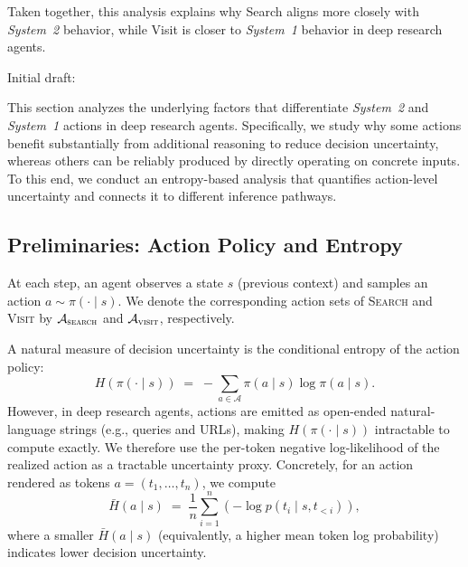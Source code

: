 Taken together, this analysis explains why Search aligns more closely with \emph{System~2} behavior, while Visit is closer to \emph{System~1} behavior in deep research agents.








\iffalse

Initial draft:

This section analyzes the underlying factors that differentiate \textit{System~2} and \textit{System~1} actions in deep research agents.
Specifically, we study why some actions benefit substantially from additional reasoning to reduce decision uncertainty, whereas others can be reliably produced by directly operating on concrete inputs.
To this end, we conduct an entropy-based analysis that quantifies action-level uncertainty and connects it to different inference pathways.

\subsection{Preliminaries: Action Policy and Entropy}
At each step, an agent observes a state $s$ (previous context) and samples an action $a \sim \pi(\cdot \mid s)$.
We denote the corresponding action sets of \textsc{Search} and \textsc{Visit} by $\mathcal{A}_{\textsc{search}}$ and $\mathcal{A}_{\textsc{visit}}$, respectively.

A natural measure of decision uncertainty is the conditional entropy of the action policy:
\begin{equation}
H(\pi(\cdot \mid s)) \;=\; -\sum_{a \in \mathcal{A}} \pi(a \mid s)\log \pi(a \mid s).
\label{eq:policy_entropy}
\end{equation}
However, in deep research agents, actions are emitted as open-ended natural-language strings (e.g., queries and URLs), making $H(\pi(\cdot \mid s))$ intractable to compute exactly.
We therefore use the per-token negative log-likelihood of the realized action as a tractable uncertainty proxy.
Concretely, for an action rendered as tokens $a = (t_1,\ldots,t_n)$, we compute
\begin{equation}
\bar{H}(a \mid s) \;=\; \frac{1}{n}\sum_{i=1}^n \left(-\log p(t_i \mid s, t_{<i})\right),
\label{eq:token_entropy_proxy}
\end{equation}
where a smaller $\bar{H}(a\mid s)$ (equivalently, a higher mean token log probability) indicates lower decision uncertainty.



